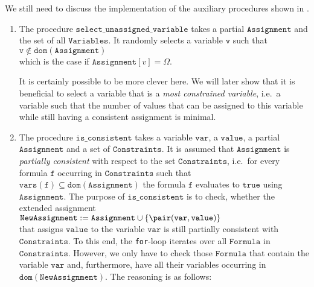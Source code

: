 We still need to discuss the implementation of the auxiliary procedures shown in . 
\begin{enumerate}
\item The procedure $\mathtt{select\_unassigned\_variable}$ takes a partial $\mathtt{Assignment}$ and the set
      of all $\mathtt{Variables}$.  It randomly selects a variable $\mathtt{v}$ such that 
      \\[0.2cm]
      \hspace*{1.3cm}
      $\mathtt{v} \not\in \mathtt{dom}(\mathtt{Assignment})$
      \\[0.2cm]
      which is the case if $\mathtt{Assignment}[v] = \Omega$.

      It is certainly possible to be more clever here.  We will later show that it is beneficial to select a
      variable that is a \emph{\color{blue}most constrained variable}, i.e.~a variable such that the number of
      values that can be assigned to this variable while still having a consistent assignment is minimal.
\item The procedure $\mathtt{is\_consistent}$ takes a variable $\mathtt{var}$, a $\mathtt{value}$, a partial 
      $\mathtt{Assignment}$ and a set of $\mathtt{Constraints}$.  It is assumed that $\mathtt{Assignment}$ is
      \emph{\color{blue}partially consistent} with respect to the set $\mathtt{Constraints}$, i.e.~for every formula $\mathtt{f}$
      occurring in $\mathtt{Constraints}$ such that $\mathtt{vars}(\mathtt{f}) \subseteq \mathtt{dom}(\mathtt{Assignment})$
      the formula $\mathtt{f}$ evaluates to $\mathtt{true}$ using $\mathtt{Assignment}$.  The purpose of
      $\mathtt{is\_consistent}$ is to check, whether the extended assignment
      \\[0.2cm]
      \hspace*{1.3cm}
      $\mathtt{NewAssignment} \;\mathtt{:=}\;\mathtt{Assignment} \cup \{ \pair(\mathtt{var}, \mathtt{value}) \}$
      \\[0.2cm]
      that assigns $\mathtt{value}$ to the variable $\mathtt{var}$ is still partially consistent with $\mathtt{Constraints}$. 
      To this end, the \texttt{for}-loop iterates over all $\mathtt{Formula}$ in $\mathtt{Constraints}$. 
      However, we only have to check those $\mathtt{Formula}$ that contain the variable $\mathtt{var}$ and,
      furthermore, have all their variables occurring in $\mathtt{dom}(\mathtt{NewAssignment})$.  The reasoning
      is as follows:
      \begin{enumerate}

\end{enumerate}
\end{enumerate}
